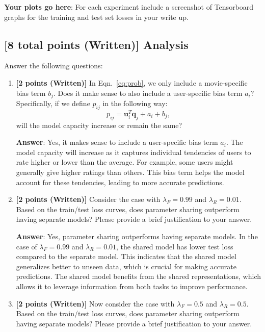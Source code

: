 \documentclass[12pt]{article}
\begin{document}
\noindent\textbf{Your plots go here}:
For each experiment include a screenshot of Tensorboard graphs for the training and test set losses in your write up.
\vspace{0.8cm}

\subsection{\textbf{[8 total points (Written)]} Analysis}
Answer the following questions:

\begin{enumerate}
    \item \textbf{[2 points (Written)]} In Eqn.~\ref{eq:prob}, we only include a movie-specific bias term $b_j$. Does it make sense to also include a user-specific bias term $a_i$? Specifically, if we define $p_{ij}$ in the following way:
    \begin{equation}
        p_{ij} = \mathbf{u}_i^T\mathbf{q}_j + a_i + b_j,
    \end{equation}
    will the model capacity increase or remain the same? 

    \textbf{Answer}: Yes, it makes sense to include a user-specific bias term $a_i$. The model capacity will increase as it captures individual tendencies of users to rate higher or lower than the average. For example, some users might generally give higher ratings than others. This bias term helps the model account for these tendencies, leading to more accurate predictions.
    \item \textbf{[2 points (Written)]} Consider the case with $\lambda_F=0.99$ and $\lambda_R=0.01$. Based on the train/test loss curves, does parameter sharing outperform having separate models? Please provide a brief justification to your answer.
    
    \textbf{Answer}: Yes, parameter sharing outperforms having separate models. In the case of $\lambda_F=0.99$ and $\lambda_R=0.01$, the shared model has lower test loss compared to the separate model. This indicates that the shared model generalizes better to unseen data, which is crucial for making accurate predictions. The shared model benefits from the shared representations, which allows it to leverage information from both tasks to improve performance.
    \item \textbf{[2 points (Written)]} Now consider the case with $\lambda_F=0.5$ and $\lambda_R=0.5$.  Based on the train/test loss curves, does parameter sharing outperform having separate models? Please provide a brief justification to your answer.
    

\end{enumerate}
\end{document}
